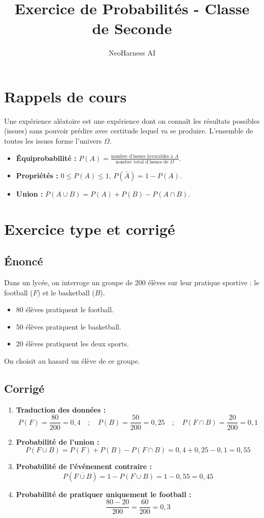 \documentclass[11pt,a4paper]{article}
\title{Exercice de Probabilités - Classe de Seconde}
\author{NeoHarness AI}
\date{}
\begin{document}
\maketitle

\section{Rappels de cours}
Une expérience aléatoire est une expérience dont on connaît les résultats possibles (issues) sans pouvoir prédire avec certitude lequel va se produire. L'ensemble de toutes les issues forme l'univers $\Omega$.
\begin{itemize}
    \item \textbf{Équiprobabilité :} $P(A) = \frac{\text{nombre d'issues favorables à } A}{\text{nombre total d'issues de } \Omega}$.
    \item \textbf{Propriétés :} $0 \le P(A) \le 1$, $P(\bar{A}) = 1 - P(A)$.
    \item \textbf{Union :} $P(A \cup B) = P(A) + P(B) - P(A \cap B)$.
\end{itemize}

\section{Exercice type et corrigé}

\subsection{Énoncé}
Dans un lycée, on interroge un groupe de 200 élèves sur leur pratique sportive : le football ($F$) et le basketball ($B$).
\begin{itemize}
    \item 80 élèves pratiquent le football.
    \item 50 élèves pratiquent le basketball.
    \item 20 élèves pratiquent les deux sports.
\end{itemize}
On choisit au hasard un élève de ce groupe.

\subsection{Corrigé}
\begin{enumerate}
    \item \textbf{Traduction des données :}
    $$P(F) = \frac{80}{200} = 0,4 \quad ; \quad P(B) = \frac{50}{200} = 0,25 \quad ; \quad P(F \cap B) = \frac{20}{200} = 0,1$$
    \item \textbf{Probabilité de l'union :}
    $$P(F \cup B) = P(F) + P(B) - P(F \cap B) = 0,4 + 0,25 - 0,1 = 0,55$$
    \item \textbf{Probabilité de l'événement contraire :}
    $$P(\overline{F \cup B}) = 1 - P(F \cup B) = 1 - 0,55 = 0,45$$
    \item \textbf{Probabilité de pratiquer uniquement le football :}
    $$\frac{80 - 20}{200} = \frac{60}{200} = 0,3$$
\end{enumerate}
\end{document}
